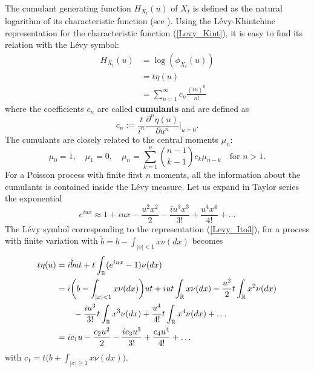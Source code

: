 The cumulant generating function $H_{X_t}(u)$ of $X_t$ is defined as the natural logarithm of its characteristic function
(see \cite{Cont}). 
Using the Lévy-Khintchine representation for the characteristic function (\ref{Levy_Kint}), it is easy to find its relation with
the Lévy symbol:
\begin{align}
H_{X_t}(u) &= \log(\phi_{X_t}(u)) \\ \nonumber
           &= t \eta(u) \\ \nonumber
           &= \sum_{n=1}^{\infty} c_n \frac{(iu)^n}{n!}
\end{align}
where the coefficients $c_n$ are called \textbf{cumulants} and are defined as
\begin{equation}\label{cumulants}
 c_n := \frac{t}{i^n} \frac{\partial^n \eta(u) }{\partial u^{n}} \biggr|_{u=0} .
\end{equation}
The cumulants are closely related to the central moments $\mu_n$: 
\begin{equation}\label{moment_cumulants}
 \mu_0 = 1,\hspace{1em} \mu_1=0, \hspace{1em} \mu_n=\sum_{k=1}^n \binom{n-1}{k-1}  c_k \mu_{n-k} \hspace{1em} \mbox{for } n>1.  
\end{equation}
For a Poisson process with finite first $n$ moments, all the information about the cumulants is contained inside the Lévy measure.
Let us expand in Taylor series the exponential 
$$ e^{iux} \approx 1 +iux - \frac{u^2x^2}{2} -\frac{iu^3x^3}{3!} +\frac{u^4x^4}{4!} + \dots $$ 
The Lévy symbol corresponding to the representation (\ref{Levy_Ito3}), for a process
with finite variation with $\tilde b = b - \int_{|x|<1} x \nu(dx)$
becomes
\begin{align}\label{cumulant_expansion}
 t \eta(u) &= i\tilde b u t + t \int_{\mathbb{R}} (e^{iux} -1) \nu(dx) \\ \nonumber
          &= i\biggl( b-\int_{|x|<1} x \nu(dx) \biggr)ut +iu t\int_{\mathbb{R}} x \nu(dx) - \frac{u^2}{2}t\int_{\mathbb{R}}x^2 \nu(dx) \\ \nonumber 
          & \hspace{2em} -\frac{iu^3}{3!}t\int_{\mathbb{R}} x^3 \nu(dx) +\frac{u^4}{4!}t\int_{\mathbb{R}} x^4 \nu(dx) + \dots\\ \nonumber
	  &= ic_1 u -\frac{c_2u^2}{2} -\frac{ic_3u^3}{3!} + \frac{c_4u^4}{4!} + \dots 
\end{align}
with $c_1= t \bigl( b+\int_{|x|\geq 1} x \nu(dx) \bigr)$.



